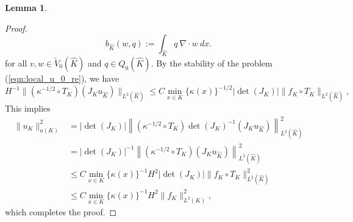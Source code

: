 \documentclass{article}[11pt]
\theoremstyle{definition}
\newtheorem{lemma}{Lemma}[section]
\begin{document}
\begin{lemma}
\begin{proof}
$$b_{\hat{K}}(w,q) :=  \int_{\hat{K}} q ~ \nabla \cdot w~ dx.$$
for all $v, w \in \tilde{V}_0({\hat{K}})$ and $q \in Q_0({\hat{K}})$. 
By the stability of the problem (\ref{eqn:local_u_0_re}), we have
\[
H^{-1} \| (\kappa^{-1/2} \circ T_K) (J_K u_{\hat{K}}) \|_{L^2(\hat{K})}\leq C \min_{x\in K}\{\kappa(x)\}^{-1/2} \left\vert \det(J_K) \right\vert \|f_K\circ T_K\|_{L^{2}(\hat{K})}, 
\]
This implies 
\begin{align*}
\|u_{K}\|_{a(K)}^{2} 
& = \vert \det(J_K) \vert \left\| (\kappa^{-1/2} \circ T_K) \det(J_K)^{-1} (J_K u_{\hat{K}}) \right\|_{L^2(\hat{K})}^2\\ 
& = \vert \det(J_K) \vert^{-1} \left\| (\kappa^{-1/2} \circ T_K) (J_K u_{\hat{K}}) \right\|_{L^2(\hat{K})}^2\\ 
& \leq C \min_{x\in K}\{\kappa(x)\}^{-1} H^2 \left\vert \det(J_K) \right\vert \|f_K\circ T_K\|_{L^{2}(\hat{K})}^2 \\ 
 & \leq C\min_{x\in K}\{\kappa(x)\}^{-1}H^{2}\|f_K\|_{L^{2}(K)}^{2},
\end{align*}
which completes the proof. 
\end{proof}
\end{lemma}
\end{document}
